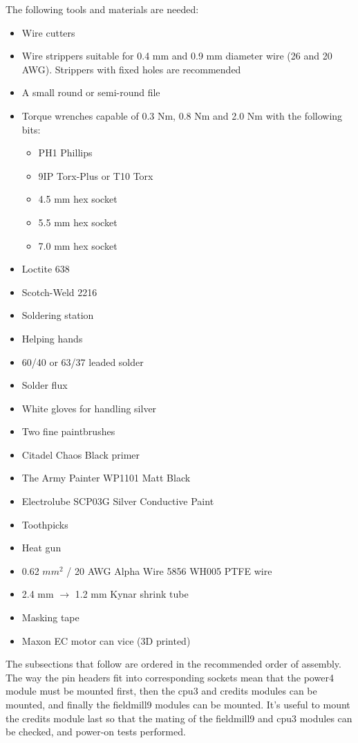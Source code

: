 \documentclass{article}
\begin{document}
The following tools and materials are needed:

\begin{itemize}
\item Wire cutters
\item Wire strippers suitable for 0.4 mm and 0.9 mm diameter wire (26 and 20 AWG). Strippers with fixed holes are recommended
\item A small round or semi-round file
\item Torque wrenches capable of 0.3 Nm, 0.8 Nm and 2.0 Nm with the following bits:
\begin{itemize}
\item PH1 Phillips
\item 9IP Torx-Plus or T10 Torx
\item 4.5 mm hex socket
\item 5.5 mm hex socket
\item 7.0 mm hex socket
\end{itemize}
\item Loctite 638
\item Scotch-Weld 2216
\item Soldering station
\item Helping hands
\item 60/40 or 63/37 leaded solder
\item Solder flux
\item White gloves for handling silver
\item Two fine paintbrushes
\item Citadel Chaos Black primer
\item The Army Painter WP1101 Matt Black
\item Electrolube SCP03G Silver Conductive Paint
\item Toothpicks
\item Heat gun
\item 0.62 $mm^2$ / 20 AWG Alpha Wire 5856 WH005 PTFE wire
\item 2.4 mm $\rightarrow$ 1.2 mm Kynar shrink tube
\item Masking tape
\item Maxon EC motor can vice (3D printed)
\end{itemize}

The subsections that follow are ordered in the recommended order of assembly.
The way the pin headers fit into corresponding sockets mean that the power4 module must be mounted first,
then the cpu3 and credits modules can be mounted, and finally the fieldmill9 modules can be mounted.
It's useful to mount the credits module last so that the mating of the fieldmill9 and cpu3 modules can be checked,
and power-on tests performed.
\end{document}
